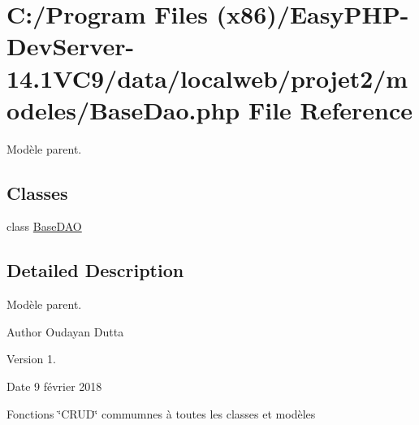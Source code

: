\hypertarget{_base_dao_8php}{}\section{C\+:/\+Program Files (x86)/\+Easy\+P\+H\+P-\/\+Dev\+Server-\/14.1\+V\+C9/data/localweb/projet2/modeles/\+Base\+Dao.php File Reference}
\label{_base_dao_8php}


Modèle parent.  


\subsection*{Classes}
\begin{DoxyCompactItemize}
\item 
class \hyperlink{class_base_d_a_o}{Base\+D\+AO}
\end{DoxyCompactItemize}


\subsection{Detailed Description}
Modèle parent. 

\begin{DoxyAuthor}{Author}
Oudayan Dutta 
\end{DoxyAuthor}
\begin{DoxyVersion}{Version}
1. 
\end{DoxyVersion}
\begin{DoxyDate}{Date}
9 février 2018
\end{DoxyDate}
Fonctions \char`\"{}\+C\+R\+U\+D\char`\"{} commumnes à toutes les classes et modèles 